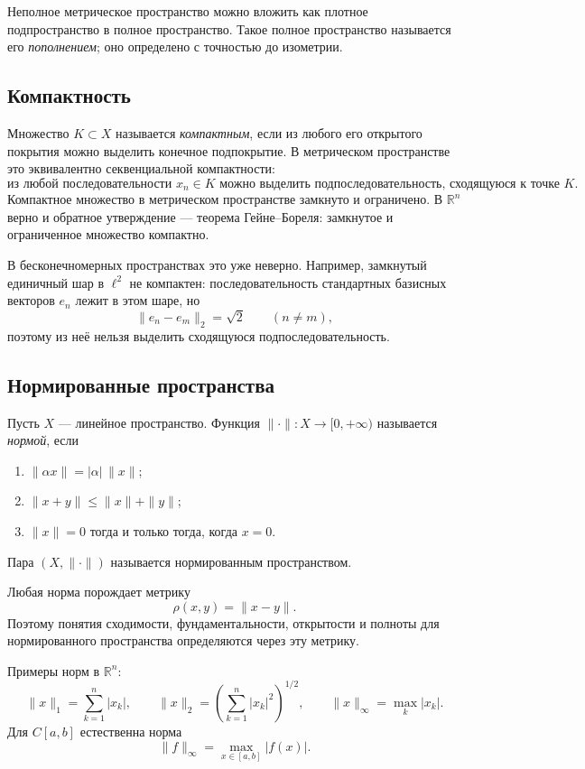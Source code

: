 Неполное метрическое пространство можно вложить как плотное подпространство в
полное пространство. Такое полное пространство называется его
\emph{пополнением}; оно определено с точностью до изометрии.

\subsection{Компактность}

Множество $K\subset X$ называется \emph{компактным}, если из любого его открытого
покрытия можно выделить конечное подпокрытие. В метрическом пространстве это
эквивалентно секвенциальной компактности:
\[
    \text{из любой последовательности }x_n\in K
    \text{ можно выделить подпоследовательность, сходящуюся к точке }K.
\]
Компактное множество в метрическом пространстве замкнуто и ограничено.
В $\mathbb R^n$ верно и обратное утверждение --- теорема Гейне--Бореля:
замкнутое и ограниченное множество компактно.

В бесконечномерных пространствах это уже неверно. Например, замкнутый единичный
шар в $\ell^2$ не компактен: последовательность стандартных базисных векторов
$e_n$ лежит в этом шаре, но
\[
    \|e_n-e_m\|_2=\sqrt2\qquad(n\neq m),
\]
поэтому из неё нельзя выделить сходящуюся подпоследовательность.

\subsection{Нормированные пространства}

Пусть $X$ --- линейное пространство. Функция $\|\cdot\|\colon X\to[0,+\infty)$
называется \emph{нормой}, если
\begin{enumerate}
    \item $\|\alpha x\|=|\alpha|\,\|x\|$;
    \item $\|x+y\|\leq\|x\|+\|y\|$;
    \item $\|x\|=0$ тогда и только тогда, когда $x=0$.
\end{enumerate}
Пара $(X,\|\cdot\|)$ называется нормированным пространством.

Любая норма порождает метрику
\[
    \rho(x,y)=\|x-y\|.
\]
Поэтому понятия сходимости, фундаментальности, открытости и полноты для
нормированного пространства определяются через эту метрику.

Примеры норм в $\mathbb R^n$:
\[
    \|x\|_1=\sum_{k=1}^n|x_k|,
    \qquad
    \|x\|_2=\left(\sum_{k=1}^n|x_k|^2\right)^{1/2},
    \qquad
    \|x\|_\infty=\max_k|x_k|.
\]
Для $C[a,b]$ естественна норма
\[
    \|f\|_\infty=\max_{x\in[a,b]}|f(x)|.
\]

